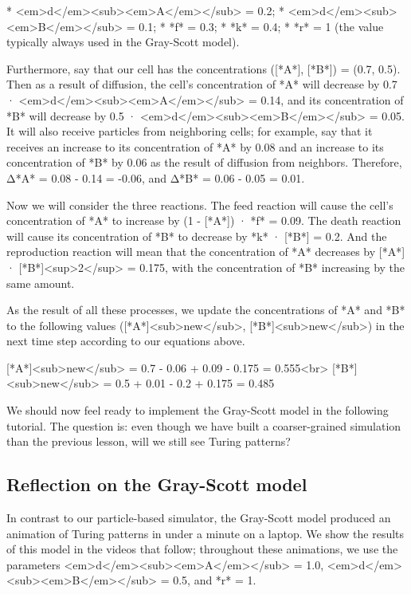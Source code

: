 {{* <em>d</em><sub><em>A</em></sub> = 0.2;
* <em>d</em><sub><em>B</em></sub> = 0.1;
* *f* = 0.3;
* *k* = 0.4;
* *r* = 1 (the value typically always used in the Gray-Scott model).

Furthermore, say that our cell has the concentrations ([*A*], [*B*]) = (0.7, 0.5). Then as a result of diffusion, the cell's concentration of *A* will decrease by 0.7 · <em>d</em><sub><em>A</em></sub> = 0.14, and its concentration of *B* will decrease by 0.5 · <em>d</em><sub><em>B</em></sub> = 0.05. It will also receive particles from neighboring cells; for example, say that it receives an increase to its concentration of *A* by 0.08 and an increase to its concentration of *B* by 0.06 as the result of diffusion from neighbors. Therefore, Δ*A* = 0.08 - 0.14 = -0.06, and Δ*B* = 0.06 - 0.05 = 0.01.

Now we will consider the three reactions. The feed reaction will cause the cell's concentration of *A* to increase by (1 - [*A*]) · *f* = 0.09. The death reaction will cause its concentration of *B* to decrease by *k* · [*B*] = 0.2. And the reproduction reaction will mean that the concentration of *A* decreases by [*A*] · [*B*]<sup>2</sup> = 0.175, with the concentration of *B* increasing by the same amount.

As the result of all these processes, we update the concentrations of *A* and *B* to the following values ([*A*]<sub>new</sub>, [*B*]<sub>new</sub>) in the next time step according to our equations above.

[*A*]<sub>new</sub> = 0.7 - 0.06 + 0.09 - 0.175 = 0.555<br>
[*B*]<sub>new</sub> = 0.5 + 0.01 - 0.2 + 0.175 = 0.485

We should now feel ready to implement the Gray-Scott model in the following tutorial. The question is: even though we have built a coarser-grained simulation than the previous lesson, will we still see Turing patterns?


\FloatBarrier
{}
\subsection{Reflection on the Gray-Scott model}

In contrast to our particle-based simulator, the Gray-Scott model produced an animation of Turing patterns in under a minute on a laptop. We show the results of this model in the videos that follow; throughout these animations, we use the parameters <em>d</em><sub><em>A</em></sub> = 1.0, <em>d</em><sub><em>B</em></sub> = 0.5, and *r* = 1.

}}
